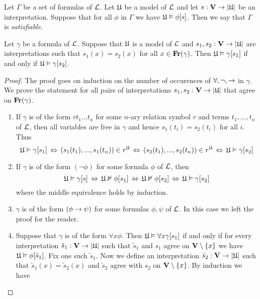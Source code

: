\documentclass[10pt]{amsart}
\begin{document}
\begin{definition}
	Let $\Gamma$ be a set of formulas of ${\mathcal L}$. Let ${\mathfrak U}$ be a model of ${\mathcal L}$ and let $s: \mathbf{V} \rightarrow |{\mathfrak U}|$ be an interpretation. Suppose that for all $\phi$ in $\Gamma$ we have ${\mathfrak U} \vDash \phi[s]$. Then we say that $\Gamma$ is \textit{satisfiable}.
\end{definition}

\begin{proposition}\label{proposition:only_free_variables_matter_for_interpretation}
	Let $\gamma$ be a formula of ${\mathcal L}$. Suppose that ${\mathfrak U}$ is a model of ${\mathcal L}$ and $s_1, s_2: \mathbf{V} \rightarrow |{\mathfrak U}|$ are interpretations such that $s_1(x) = s_2(x)$ for all $x\in \mathbf{Fr}(\gamma)$. Then ${\mathfrak U} \vDash \gamma[s_1]$ if and only if ${\mathfrak U} \vDash \gamma[s_2]$.
\end{proposition}
\begin{proof}
	The proof goes on induction on the number of occurences of $\forall, \neg, \rightarrow$ in $\gamma$. We prove the
	statement for all pairs of interpretations $s_1,s_2: \mathbf{V} \rightarrow |{\mathfrak U}|$ that agree on $\mathbf{Fr}(\gamma)$.
	\begin{enumerate}[label=\textbf{(\arabic*)}, leftmargin=3.0em]
		\item If $\gamma$ is of the form $rt_1 ...t_n$ for some $n$-ary relation symbol $r$ and terms $t_1,...,t_n$ of ${\mathcal L}$, then all variables are free in $\gamma$ and hence $s_1(t_i) = s_2(t_i)$ for all $i$. Thus
		      $${\mathfrak U} \vDash \gamma[s_1] \,\Leftrightarrow\, \left(s_1(t_1), ...,s_1(t_n)\right) \in r^{\mathfrak U} \,\Leftrightarrow\, \left(s_2(t_1),...,s_2(t_n)\right) \in r^{\mathfrak U} \,\Leftrightarrow\, {\mathfrak U} \vDash \gamma[s_2]$$
		\item If $\gamma$ is of the form $(\neg \phi)$ for some formula $\phi$ of ${\mathcal L}$, then
		      $${\mathfrak U} \vDash \gamma[s] \,\Leftrightarrow\, {\mathfrak U} \nvDash \phi[s_1] \,\Leftrightarrow\, {\mathfrak U} \nvDash \phi[s_2] \,\Leftrightarrow\, {\mathfrak U} \vDash \gamma[s_2]$$
		      where the middle equivalence holds by induction.
		\item $\gamma$ is of the form $(\phi \rightarrow \psi)$ for some formulas $\phi, \psi$ of ${\mathcal L}$. In this case we left the proof for the
		      reader.
		\item Suppose that $\gamma$ is of the form $\forall x \phi$. Then ${\mathfrak U} \vDash \forall x \gamma[s_1]$ if and only if for every interpretation $\tilde{s}_1:\mathbf{V} \rightarrow |{\mathfrak U}|$ such that $\tilde{s}_1$ and $s_1$ agree on $\mathbf{V} \setminus\{x\}$ we have ${\mathfrak U} \vDash \phi[\tilde{s}_1]$. Fix one such $\tilde{s}_1$. Now we define an interpretation $\tilde{s}_2:\mathbf{V} \rightarrow |{\mathfrak U}|$ such that $\tilde{s}_1(x) = \tilde{s}_2(x)$ and $\tilde{s}_2$ agree with $s_2$ on $\mathbf{V} \setminus \{x\}$. By induction we have

\end{enumerate}
\end{proof}
\end{document}
